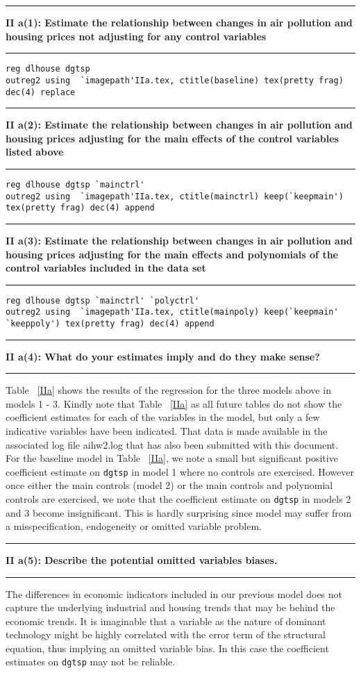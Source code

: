 \documentclass[12pt]{article}
\newcommand\question[2]{\vspace{1em}\hrule\vspace{1em}\textbf{#1: #2}\vspace{1em}\hrule\vspace{1em}}
\begin{document}
\question{II a(1)}{Estimate the relationship between changes in air pollution and housing prices not adjusting for any control variables }
\begin{lstlisting}
reg dlhouse dgtsp
outreg2 using  `imagepath'IIa.tex, ctitle(baseline) tex(pretty frag) dec(4) replace
\end{lstlisting}

\begin{table}
\caption{}

\label{IIa}
\end{table}

\question{II a(2)}{Estimate the relationship between changes in air pollution and housing prices adjusting for the main effects of the control variables listed above }
\begin{lstlisting}
reg dlhouse dgtsp `mainctrl'
outreg2 using  `imagepath'IIa.tex, ctitle(mainctrl) keep(`keepmain') tex(pretty frag) dec(4) append
\end{lstlisting}

\question{II a(3)}{Estimate the relationship between changes in air pollution and housing prices adjusting for the main effects and polynomials of the control variables included in the data set }
\begin{lstlisting}
reg dlhouse dgtsp `mainctrl' `polyctrl'
outreg2 using  `imagepath'IIa.tex, ctitle(mainpoly) keep(`keepmain' `keeppoly') tex(pretty frag) dec(4) append
\end{lstlisting}

\question{II a(4)}{ What do your estimates imply and do they make sense? }
Table ~\ref{IIa} shows the results of the regression for the three models above in models 1 - 3. Kindly note that Table ~\ref{IIa} as all future tables do not show the coefficient estimates for each of the variables in the model, but only a few indicative variables have been indicated. That data is made available in the associated log file aihw2.log that has also been submitted with this document. For the baseline model in Table ~\ref{IIa}, we note a small but significant positive coefficient estimate on \verb|dgtsp| in model 1 where no controls are exercised. However once either the main controls (model 2) or the main controls and polynomial controls are exercised, we note that the coefficient estimate on \verb|dgtsp| in models 2 and 3 become insignificant. This is hardly surprising since model may suffer from a misspecification, endogeneity or omitted variable problem.

\question{II a(5)}{Describe the potential omitted variables biases.}
The differences in economic indicators included in our previous model does not capture the underlying industrial and housing trends that may be behind the economic trends. It is imaginable that a variable as the nature of dominant technology might be highly correlated with the error term of the structural equation, thus implying an omitted variable bias. In this case the coefficient estimates on \verb|dgtsp| may not be reliable.
 
\end{document}
